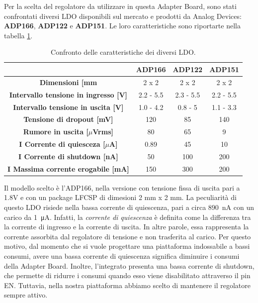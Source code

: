 Per la scelta del regolatore da utilizzare in questa Adapter Board, sono stati confrontati diversi LDO disponibili sul mercato e prodotti da Analog Devices: \textbf{ADP166}\cite{AnalogDevicesADP166}, \textbf{ADP122}\cite{AnalogDevicesADP122} e \textbf{ADP151}\cite{AnalogDevicesADP151}. Le loro caratteristiche sono riportarte nella tabella \ref{tab:ConfrontoLDO}.
\begin{table}[h]
	\renewcommand{\arraystretch}{1.5}
	\centering
	\begin{tabular}{cccc}
		\hline
		& \textbf{ADP166} & \textbf{ADP122} & \textbf{ADP151} \\ \hline
		\textbf{Dimensioni {[}mm\ap{2}{]}}                   & 2 x 2           & 2 x 2           & 2 x 2           \\ \hline
		\textbf{Intervallo tensione in ingresso {[}V{]}}  & 2.2 - 5.5       & 2.3 - 5.5       & 2.2 - 5.5       \\ \hline
		\textbf{Intervallo tensione in uscita {[}V{]}}    & 1.0 - 4.2       & 0.8 - 5         & 1.1 - 3.3       \\ \hline
		\textbf{Tensione di dropout {[}mV{]}}            & 120             & 85              & 140             \\ \hline
		\textbf{Rumore in uscita {[}$\mu$Vrms{]}}         & 80              & 65              & 9               \\ \hline
		\textbf{I\ped{q} Corrente di quiesceza {[}$\mu$A{]}}    & 0.89            & 45              & 10              \\ \hline
		\textbf{I\ped{s} Corrente di shutdown {[}nA{]}}      & 50              & 100             & 200             \\ \hline
		\textbf{I\ped{MAX} Massima corrente erogabile {[}mA{]}} & 150             & 300             & 200             \\ \hline
	\end{tabular}
	\caption{Confronto delle caratteristiche dei diversi LDO.}
	\label{tab:ConfrontoLDO}
\end{table}

\noindent Il modello scelto è l'ADP166, nella versione con tensione fissa di uscita pari a 1.8V e con un package LFCSP di dimesioni 2 mm x 2 mm. La peculiarità di questo LDO risiede nella bassa corrente di quiescenza, pari a circa \SI{890}{\nano\ampere} con un carico da \SI{1}{\micro\ampere}\cite{AnalogDevicesADP166}. Infatti, la \textit{corrente di quiescenza} è definita come la differenza tra la corrente di ingresso e la corrente di uscita\cite{Lee1999}. In altre parole, essa rappresenta la corrente assorbita dal regolatore di tensione e non trasferita al carico. Per questo motivo, dal momento che si vuole progettare una piattaforma indossabile a bassi consumi, avere una bassa corrente di quiescenza significa diminuire i consumi della Adapter Board. Inoltre, l'integrato presenta una bassa corrente di shutdown, che permette di ridurre i consumi quando esso viene disabilitato attraverso il pin EN. Tuttavia, nella nostra piattaforma abbiamo scelto di mantenere il regolatore sempre attivo.

